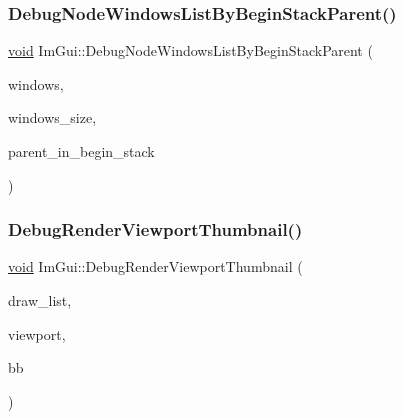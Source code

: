 \mbox{\label{namespaceImGui_a0fc8019faf3a1aec25b554384ad9e506}} 
\subsubsection{\texorpdfstring{Debug\+Node\+Windows\+List\+By\+Begin\+Stack\+Parent()}{DebugNodeWindowsListByBeginStackParent()}}
{\footnotesize\ttfamily \hyperlink{imgui__impl__opengl3__loader_8h_ac668e7cffd9e2e9cfee428b9b2f34fa7}{void} Im\+Gui\+::\+Debug\+Node\+Windows\+List\+By\+Begin\+Stack\+Parent (\begin{DoxyParamCaption}\item[{\hyperlink{structImGuiWindow}{Im\+Gui\+Window} $\ast$$\ast$}]{windows,  }\item[{int}]{windows\+\_\+size,  }\item[{\hyperlink{structImGuiWindow}{Im\+Gui\+Window} $\ast$}]{parent\+\_\+in\+\_\+begin\+\_\+stack }\end{DoxyParamCaption})}

\mbox{\label{namespaceImGui_af7de4b5c98ba30dbadce44e1f1066ba8}} 
\subsubsection{\texorpdfstring{Debug\+Render\+Viewport\+Thumbnail()}{DebugRenderViewportThumbnail()}}
{\footnotesize\ttfamily \hyperlink{imgui__impl__opengl3__loader_8h_ac668e7cffd9e2e9cfee428b9b2f34fa7}{void} Im\+Gui\+::\+Debug\+Render\+Viewport\+Thumbnail (\begin{DoxyParamCaption}\item[{\hyperlink{structImDrawList}{Im\+Draw\+List} $\ast$}]{draw\+\_\+list,  }\item[{\hyperlink{structImGuiViewportP}{Im\+Gui\+ViewportP} $\ast$}]{viewport,  }\item[{const \hyperlink{structImRect}{Im\+Rect} \&}]{bb }\end{DoxyParamCaption})}


